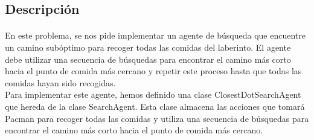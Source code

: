 \documentclass{report}
\begin{document}
        \subsection*{Descripción}
          \paragraph*{}{
            En este problema, se nos pide implementar un agente de búsqueda que encuentre un camino subóptimo para recoger todas las comidas del laberinto. El agente debe utilizar una secuencia de búsquedas para encontrar el camino más corto hacia el punto de comida más cercano y repetir este proceso hasta que todas las comidas hayan sido recogidas.\\
            Para implementar este agente, hemos definido una clase ClosestDotSearchAgent que hereda de la clase SearchAgent. Esta clase almacena las acciones que tomará Pacman para recoger todas las comidas y utiliza una secuencia de búsquedas para encontrar el camino más corto hacia el punto de comida más cercano.\\
          }
\end{document}
